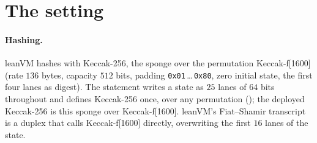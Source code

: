 \documentclass[11pt]{article}
\begin{document}
\section{The setting}

\paragraph{Hashing.} leanVM hashes with Keccak-256, the sponge over the permutation
Keccak-f[1600] (rate $136$ bytes, capacity $512$ bits, padding \texttt{0x01}\,\dots\,\texttt{0x80},
zero initial state, the first four lanes as digest). The statement writes a state as $25$ lanes of
$64$ bits throughout and defines Keccak-256 once, over any permutation ();
the deployed Keccak-256 is this sponge over Keccak-f[1600]. leanVM's Fiat--Shamir transcript is a
duplex that calls Keccak-f[1600] directly, overwriting the first $16$ lanes of the state.
\end{document}
